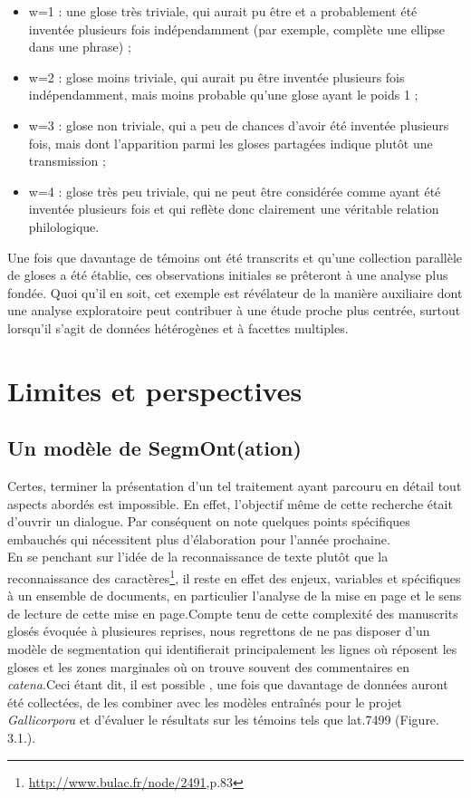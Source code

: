 \documentclass[a4paper, twoside, 12pt]{book}
\begin{document}
\begin{itemize}
\item w=1 : une glose très triviale, qui aurait pu être et a probablement été inventée plusieurs fois indépendamment (par exemple, complète une ellipse dans une phrase) ;
\item w=2 : glose moins triviale, qui aurait pu être inventée plusieurs fois indépendamment, mais moins probable qu'une glose ayant le poids 1 ;
\item w=3 : glose non triviale, qui a peu de chances d'avoir été inventée plusieurs fois, mais dont l'apparition parmi les gloses partagées indique plutôt une transmission ;
\item w=4 : glose très peu triviale, qui ne peut être considérée comme ayant été inventée plusieurs fois et qui reflète donc clairement une véritable relation philologique.
\end{itemize}
Une fois que davantage de témoins ont été transcrits et qu'une collection parallèle de gloses a été établie, ces observations initiales se prêteront à une analyse plus fondée. Quoi qu'il en soit, cet exemple est révélateur de la manière auxiliaire dont une analyse exploratoire peut contribuer à une étude proche plus centrée, surtout lorsqu'il s'agit de données hétérogènes et à facettes multiples.

\chapter{Limites et perspectives}
\section{Un modèle de SegmOnt(ation)}

Certes, terminer la présentation d’un tel traitement ayant parcouru en détail tout aspects abordés est impossible. En effet, l’objectif même de cette recherche était d’ouvrir un dialogue. Par conséquent on note quelques points spécifiques embauchés qui nécessitent plus d’élaboration pour l'année prochaine.\\

En se penchant sur l'idée de la reconnaissance de texte plutôt que la reconnaissance des caractères\footnote{\url{http://www.bulac.fr/node/2491},p.83}, il reste en effet des enjeux, variables et spécifiques à un ensemble de documents, en particulier l’analyse de la mise en page et le sens de lecture de cette mise en page.Compte tenu de cette complexité des manuscrits glosés évoquée à plusieures reprises,  nous regrettons de ne pas disposer d'un modèle de segmentation qui identifierait principalement les lignes où réposent les gloses et les zones marginales où on trouve souvent des commentaires en \textit{catena}.Ceci étant dit, il est possible , une fois que davantage de données auront été collectées, de les combiner avec les modèles entraînés pour le projet \textit{Gallicorpora} et d'évaluer le résultats sur les témoins tels que lat.7499 (Figure. 3.1.). 
\end{document}
